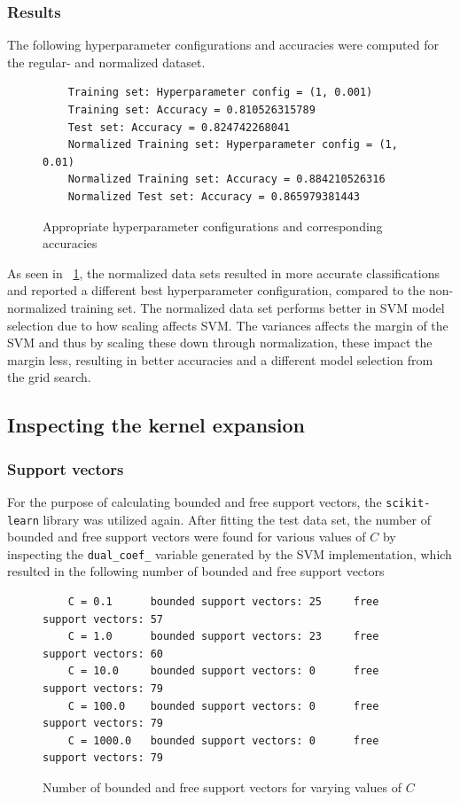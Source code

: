 \documentclass[a4paper]{article}
\begin{document}
\subsubsection{Results}
The following hyperparameter configurations and accuracies were computed for the regular- and normalized dataset.

\begin{figure}[H]
	\begin{lstlisting}
	Training set: Hyperparameter config = (1, 0.001)
	Training set: Accuracy = 0.810526315789
	Test set: Accuracy = 0.824742268041
	Normalized Training set: Hyperparameter config = (1, 0.01)
	Normalized Training set: Accuracy = 0.884210526316
	Normalized Test set: Accuracy = 0.865979381443
	\end{lstlisting}
	\caption{Appropriate hyperparameter configurations and corresponding accuracies}
	\label{fig:grid_search_results}
\end{figure}

As seen in ~\ref{fig:grid_search_results}, the normalized data sets resulted in more accurate classifications and reported a different best hyperparameter configuration, compared to the non-normalized training set. The normalized data set performs better in SVM model selection due to how scaling affects SVM. The variances affects the margin of the SVM and thus by scaling these down through normalization, these impact the margin less, resulting in better accuracies and a different model selection from the grid search.

\subsection{Inspecting the kernel expansion}
\subsubsection{Support vectors}
For the purpose of calculating bounded and free support vectors, the \texttt{scikit-learn} library was utilized again. After fitting the test data set, the number of bounded and free support vectors were found for various values of $C$ by inspecting the \texttt{dual\_coef\_} variable generated by the SVM implementation, which resulted in the following number of bounded and free support vectors
\begin{figure}[H]
	\begin{lstlisting}
	C = 0.1 	 bounded support vectors: 25 	 free support vectors: 57
	C = 1.0 	 bounded support vectors: 23 	 free support vectors: 60
	C = 10.0 	 bounded support vectors: 0 	 free support vectors: 79
	C = 100.0 	 bounded support vectors: 0 	 free support vectors: 79
	C = 1000.0 	 bounded support vectors: 0 	 free support vectors: 79
	\end{lstlisting}
	\caption{Number of bounded and free support vectors for varying values of $C$}
	\label{fig:free_bounded}
\end{figure}
\end{document}
